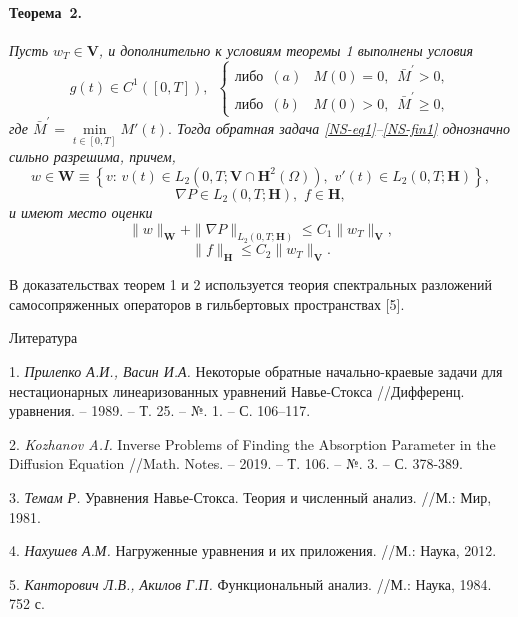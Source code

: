 \documentclass{vzmsthesis}
\begin{document}
\paragraph{Теорема~2.} {\it
Пусть $w_T\in\mathbf{V}$, и дополнительно к условиям теоремы 1 выполнены условия
\begin{equation}\label{NS-cond1}
g(t)\in C^1([0,T]),\,\,\,\left\{\begin{array}{ll}
                         \textrm{либо}\,\,\, (a)&M(0)=0,\,\,\, \bar{M}^{\prime}>0,\\
                         \textrm{либо}\,\,\, (b)&M(0)>0,\,\,\, \bar{M}^{\prime}\geq0,
                         \end{array}\right.
\end{equation}
где $\bar{M}^{\prime}=\min\limits_{t\in[0,T]}M'(t).$
Тогда обратная задача \eqref{NS-eq1}--\eqref{NS-fin1} однозначно сильно разрешима, причем,
$$
w\in \mathbf{W}\equiv \left\{v:\, v(t)\in L_2(0,T;\mathbf{V}\cap\mathbf{H}^2(\Omega)),\,\, v'(t)\in L_2(0,T;\mathbf{H})\right\},
$$
$$
\nabla P\in L_2(0,T; \mathbf{H}),\,\, f\in \mathbf{H},
$$
и имеют место оценки
\begin{equation} \label{NS-est3}
\|w\|_{\mathbf{W}}+\|\nabla P\|_{L_2(0,T; \mathbf{H})}\leq C_1\|w_T\|_{\mathbf{V}},
\end{equation}
\begin{equation} \label{NS-est4}
\|f\|_{\mathbf{H}}\leq C_2\|w_T\|_{\mathbf{V}}.
\end{equation}
}

В доказательствах теорем 1 и 2 используется теория спектральных разложений самосопряженных операторов в гильбертовых пространствах [5].


\begin{center}
Литература
\end{center}

1. {\it Прилепко А.И., Васин И.А.} Некоторые обратные на\-чально-краевые задачи для нестационарных линеаризованных уравнений Навье-Стокса //Дифференц. уравнения. – 1989. – Т. 25. – №. 1. – С. 106–117.

2. {\it Kozhanov A.I.} Inverse Problems of Finding the Absorption Parameter in the Diffusion Equation //Math. Notes. – 2019. – Т. 106. – №. 3. – С. 378-389.

3. {\it Темам Р.} Уравнения Навье-Стокса. Теория и численный анализ. //М.: Мир, 1981.

4. {\it Нахушев А.М.}  Нагруженные уравнения и их приложения. //М.: Наука, 2012.

5. {\it Канторович Л.В., Акилов Г.П.} Функциональный анализ. //М.: Наука, 1984. 752 с.
\end{document}
